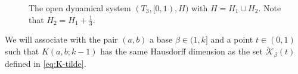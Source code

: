 \documentclass[12pt]{amsart}
\theoremstyle{definition}
\theoremstyle{remark}
\numberwithin{equation}{section}
\newcommand{\K}{\mathcal K}
\begin{document}
{\begin{figure}[h!]
\begin{center}
\begin{tikzpicture}
%


\end{tikzpicture}
\caption{The open dynamical system $(T_3, [0,1), H)$ with $H=H_1\cup H_2$. Note that $H_2=H_1+\frac13$.}
\label{fig:k-map-H}
\end{center}
\end{figure} 
 
We will associate with the pair $(a,b)$ a base $\beta\in(1,k]$ and a point $t\in(0,1)$ such that $K(a,b;k-1)$ has the same Hausdorff dimension as the set $\widetilde{\K}_\beta(t)$ defined in \eqref{eq:K-tilde}.

}
\end{document}
